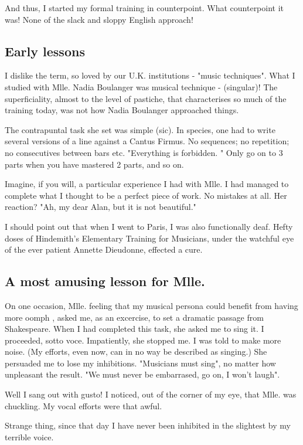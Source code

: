 \documentclass{article}
\begin{document}
And thus, I started my formal training in counterpoint.
What counterpoint it was!
None of the slack and sloppy English approach!

\subsection{Early lessons}

I dislike the term, so loved by our U.K. institutions - "music techniques".
What I studied with Mlle.
Nadia Boulanger was musical technique - (singular)! The superficiality, almost to the level of pastiche, that characterises so much of the training today, was not how Nadia Boulanger approached things.

The contrapuntal task she set was simple (sic).
In species,  one had to write several versions of a line against a Cantus Firmus.
No sequences; no repetition; no consecutives between bars etc.
"Everything is forbidden.
" Only go on to 3 parts when you have mastered 2 parts, and so on.

Imagine, if you will, a particular experience I had with Mlle.
I had managed to complete what I thought to be a perfect piece of work.
No mistakes at all.
Her reaction? "Ah, my dear Alan, but it is not beautiful."

I should point out that when I went to Paris, I was also functionally deaf.
Hefty doses of Hindemith's Elementary Training for Musicians, under the watchful eye of the ever patient Annette Dieudonne, effected a cure.

\subsection{A most amusing lesson for Mlle.}

On one occasion, Mlle. feeling that my musical persona could benefit from having more oomph , asked me, as an excercise, to set a dramatic passage from Shakespeare.
When I had completed this task, she asked me to sing it.
I proceeded, sotto voce.
Impatiently, she stopped me.
I was told to make more noise.
(My efforts, even now, can in no way be described as singing.)
She persuaded me to lose my inhibitions.
"Musicians must sing", no matter how unpleasant the result.
"We must never be embarrased, go on, I won't laugh".

Well I sang out with gusto!
I noticed, out of the corner of my eye, that Mlle. was chuckling.
My vocal efforts were that awful.

Strange thing, since that day I have never been inhibited in the slightest by my terrible voice.
\end{document}

